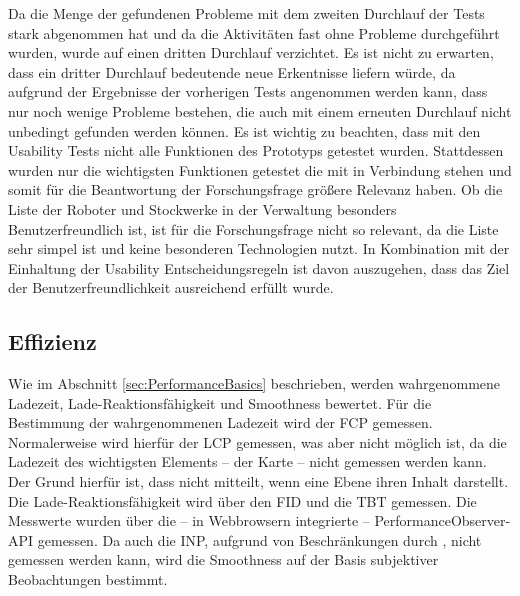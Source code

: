 Da die Menge der gefundenen Probleme mit dem zweiten Durchlauf der Tests stark abgenommen hat und da die Aktivitäten fast ohne Probleme durchgeführt wurden, wurde auf einen dritten Durchlauf verzichtet. Es ist nicht zu erwarten, dass ein dritter Durchlauf bedeutende neue Erkentnisse liefern würde, da aufgrund der Ergebnisse der vorherigen Tests angenommen werden kann, dass nur noch wenige Probleme bestehen, die auch mit einem erneuten Durchlauf nicht unbedingt gefunden werden können. Es ist wichtig zu beachten, dass mit den Usability Tests nicht alle Funktionen des Prototyps getestet wurden. Stattdessen wurden nur die wichtigsten Funktionen getestet die mit \deckgl{} in Verbindung stehen und somit für die Beantwortung der Forschungsfrage größere Relevanz haben. Ob die Liste der Roboter und Stockwerke in der Verwaltung besonders Benutzerfreundlich ist, ist für die Forschungsfrage nicht so relevant, da die Liste sehr simpel ist und keine besonderen Technologien nutzt. In Kombination mit der Einhaltung der Usability Entscheidungsregeln ist davon auszugehen, dass das Ziel der Benutzerfreundlichkeit ausreichend erfüllt wurde.

\subsection{Effizienz}
Wie im Abschnitt \ref{sec:PerformanceBasics} beschrieben, werden wahrgenommene Ladezeit, Lade-Reaktionsfähigkeit und Smoothness bewertet. Für die Bestimmung der wahrgenommenen Ladezeit wird der \ac{FCP} gemessen. Normalerweise wird hierfür der \ac{LCP} gemessen, was aber nicht möglich ist, da die Ladezeit des wichtigsten Elements – der \deckgl{} Karte – nicht gemessen werden kann. Der Grund hierfür ist, dass \deckgl{} nicht mitteilt, wenn eine Ebene ihren Inhalt darstellt. Die Lade-Reaktionsfähigkeit wird über den \ac{FID} und die \ac{TBT} gemessen. Die Messwerte wurden über die – in Webbrowsern integrierte – PerformanceObserver-\ac{API} \cite{PerformanceObserver} gemessen. Da auch die \ac{INP}, aufgrund von Beschränkungen durch \deckgl{}, nicht gemessen werden kann, wird die Smoothness auf der Basis subjektiver Beobachtungen bestimmt.



